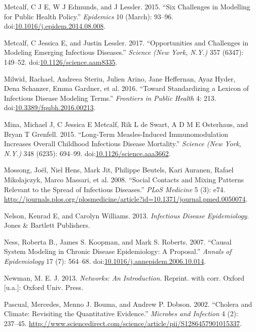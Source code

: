 \documentclass[]{article}
\theoremstyle{definition}
\theoremstyle{definition}
\theoremstyle{definition}
\theoremstyle{remark}
\begin{document}
\hypertarget{ref-metcalf15}{}
Metcalf, C J E, W J Edmunds, and J Lessler. 2015. ``Six Challenges in
Modelling for Public Health Policy.'' \emph{Epidemics} 10 (March):
93--96.
doi:\href{https://doi.org/10.1016/j.epidem.2014.08.008}{10.1016/j.epidem.2014.08.008}.

\hypertarget{ref-metcalf17}{}
Metcalf, C Jessica E, and Justin Lessler. 2017. ``Opportunities and
Challenges in Modeling Emerging Infectious Diseases.'' \emph{Science
(New York, N.Y.)} 357 (6347): 149--52.
doi:\href{https://doi.org/10.1126/science.aam8335}{10.1126/science.aam8335}.

\hypertarget{ref-milwid16}{}
Milwid, Rachael, Andreea Steriu, Julien Arino, Jane Heffernan, Ayaz
Hyder, Dena Schanzer, Emma Gardner, et al. 2016. ``Toward Standardizing
a Lexicon of Infectious Disease Modeling Terms.'' \emph{Frontiers in
Public Health} 4: 213.
doi:\href{https://doi.org/10.3389/fpubh.2016.00213}{10.3389/fpubh.2016.00213}.

\hypertarget{ref-mina15}{}
Mina, Michael J, C Jessica E Metcalf, Rik L de Swart, A D M E Osterhaus,
and Bryan T Grenfell. 2015. ``Long-Term Measles-Induced Immunomodulation
Increases Overall Childhood Infectious Disease Mortality.''
\emph{Science (New York, N.Y.)} 348 (6235): 694--99.
doi:\href{https://doi.org/10.1126/science.aaa3662}{10.1126/science.aaa3662}.

\hypertarget{ref-mossong08}{}
Mossong, Joël, Niel Hens, Mark Jit, Philippe Beutels, Kari Auranen,
Rafael Mikolajczyk, Marco Massari, et al. 2008. ``Social Contacts and
Mixing Patterns Relevant to the Spread of Infectious Diseases.''
\emph{PLoS Medicine} 5 (3): e74.
\url{http://journals.plos.org/plosmedicine/article?id=10.1371/journal.pmed.0050074}.

\hypertarget{ref-nelson13}{}
Nelson, Kenrad E, and Carolyn Williams. 2013. \emph{Infectious Disease
Epidemiology}. Jones \& Bartlett Publishers.

\hypertarget{ref-ness07}{}
Ness, Roberta B., James S. Koopman, and Mark S. Roberts. 2007. ``Causal
System Modeling in Chronic Disease Epidemiology: A Proposal.''
\emph{Annals of Epidemiology} 17 (7): 564--68.
doi:\href{https://doi.org/10.1016/j.annepidem.2006.10.014}{10.1016/j.annepidem.2006.10.014}.

\hypertarget{ref-newman13}{}
Newman, M. E. J. 2013. \emph{Networks: An Introduction}. Reprint. with
corr. Oxford {[}u.a.{]}: Oxford Univ. Press.

\hypertarget{ref-pascual02}{}
Pascual, Mercedes, Menno J. Bouma, and Andrew P. Dobson. 2002. ``Cholera
and Climate: Revisiting the Quantitative Evidence.'' \emph{Microbes and
Infection} 4 (2): 237--45.
\url{http://www.sciencedirect.com/science/article/pii/S1286457901015337}.
\end{document}
